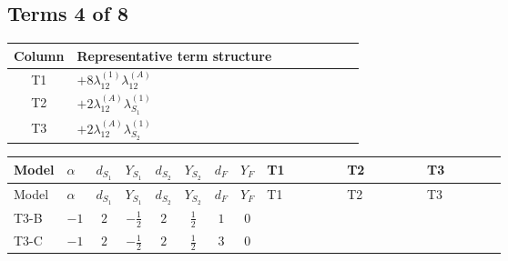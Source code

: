 \documentclass[8pt]{article}
\begin{document}
\begin{landscape}
\subsection*{Terms 4 of 8}
\begin{center}
\begin{tabular}{@{}c >{\raggedright\arraybackslash}p{0.82\linewidth}@{}}
\toprule
Column & Representative term structure \\
\midrule
T1 & \(\displaystyle +8 {\lambda_{12}^{(1)}} {\lambda_{12}^{(A)}}\) \\
\midrule
T2 & \(\displaystyle +2 {\lambda_{12}^{(A)}} {\lambda_{S_1}^{(1)}}\) \\
\midrule
T3 & \(\displaystyle +2 {\lambda_{12}^{(A)}} {\lambda_{S_2}^{(1)}}\) \\
\midrule
\bottomrule
\end{tabular}
\end{center}
\smallskip
\tiny
\begin{longtable}{@{}llcccccc >{\raggedright\arraybackslash}p{0.21\linewidth} >{\raggedright\arraybackslash}p{0.21\linewidth} >{\raggedright\arraybackslash}p{0.21\linewidth}@{}}
\toprule
Model & $\alpha$ & $d_{S_1}$ & $Y_{S_1}$ & $d_{S_2}$ & $Y_{S_2}$ & $d_F$ & $Y_F$ & T1 & T2 & T3 \\
\midrule
\endfirsthead
\toprule
Model & $\alpha$ & $d_{S_1}$ & $Y_{S_1}$ & $d_{S_2}$ & $Y_{S_2}$ & $d_F$ & $Y_F$ & T1 & T2 & T3 \\
\midrule
\endhead
T3-B & $-1$ & $2$ & $-\frac{1}{2}$ & $2$ & $\frac{1}{2}$ & $1$ & $0$ & \scriptsize\adjustbox{max width=\linewidth}{$\begin{gathered} +8 {\lambda_{12}^{(1)}} {\lambda_{12}^{(A)}}\end{gathered}$} & \scriptsize\adjustbox{max width=\linewidth}{$\begin{gathered} +2 {\lambda_{12}^{(A)}} {\lambda_{S_1}^{(1)}}\end{gathered}$} & \scriptsize\adjustbox{max width=\linewidth}{$\begin{gathered} +2 {\lambda_{12}^{(A)}} {\lambda_{S_2}^{(1)}}\end{gathered}$} \\
\midrule
T3-C & $-1$ & $2$ & $-\frac{1}{2}$ & $2$ & $\frac{1}{2}$ & $3$ & $0$ & \scriptsize\adjustbox{max width=\linewidth}{$\begin{gathered} +8 {\lambda_{12}^{(1)}} {\lambda_{12}^{(A)}}\end{gathered}$} & \scriptsize\adjustbox{max width=\linewidth}{$\begin{gathered} +2 {\lambda_{12}^{(A)}} {\lambda_{S_1}^{(1)}}\end{gathered}$} & \scriptsize\adjustbox{max width=\linewidth}{$\begin{gathered} +2 {\lambda_{12}^{(A)}} {\lambda_{S_2}^{(1)}}\end{gathered}$} \\

\end{longtable}
\end{landscape}
\end{document}

